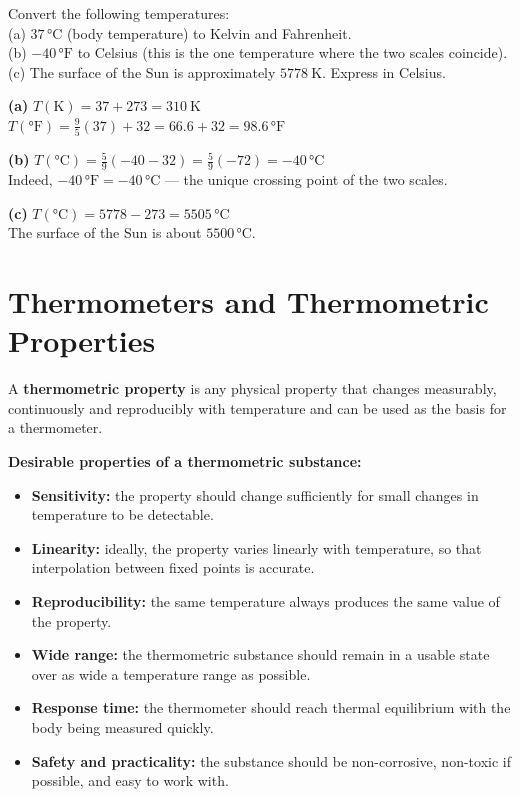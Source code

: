 \begin{examplebox}[13.1]
Convert the following temperatures:\\
(a) $37\,°\text{C}$ (body temperature) to Kelvin and
Fahrenheit.\\
(b) $-40\,°\text{F}$ to Celsius (this is the one
temperature where the two scales coincide).\\
(c) The surface of the Sun is approximately
$5778\ \text{K}$. Express in Celsius.
\end{examplebox}

\begin{solutionbox}
\textbf{(a)}
$T(\text{K}) = 37 + 273 = 310\ \text{K}$\\
$T(°\text{F}) = \frac{9}{5}(37) + 32 = 66.6 + 32
= 98.6\,°\text{F}$

\textbf{(b)}
$T(°\text{C}) = \frac{5}{9}(-40 - 32)
= \frac{5}{9}(-72) = -40\,°\text{C}$\\
Indeed, $-40\,°\text{F} = -40\,°\text{C}$ --- the unique
crossing point of the two scales.

\textbf{(c)}
$T(°\text{C}) = 5778 - 273 = 5505\,°\text{C}$\\
The surface of the Sun is about $5500\,°\text{C}$.
\end{solutionbox}

\section{Thermometers and Thermometric Properties}

\begin{definitionbox}
A \textbf{thermometric property} is any physical
property that changes measurably, continuously and
reproducibly with temperature and can be used as the
basis for a thermometer.

\textbf{Desirable properties of a thermometric
substance:}
\begin{itemize}[noitemsep]
  \item \textbf{Sensitivity:} the property should
  change sufficiently for small changes in temperature
  to be detectable.
  \item \textbf{Linearity:} ideally, the property
  varies linearly with temperature, so that
  interpolation between fixed points is accurate.
  \item \textbf{Reproducibility:} the same temperature
  always produces the same value of the property.
  \item \textbf{Wide range:} the thermometric substance
  should remain in a usable state over as wide a
  temperature range as possible.
  \item \textbf{Response time:} the thermometer should
  reach thermal equilibrium with the body being
  measured quickly.
  \item \textbf{Safety and practicality:} the substance
  should be non-corrosive, non-toxic if possible, and
  easy to work with.
\end{itemize}
\end{definitionbox}

